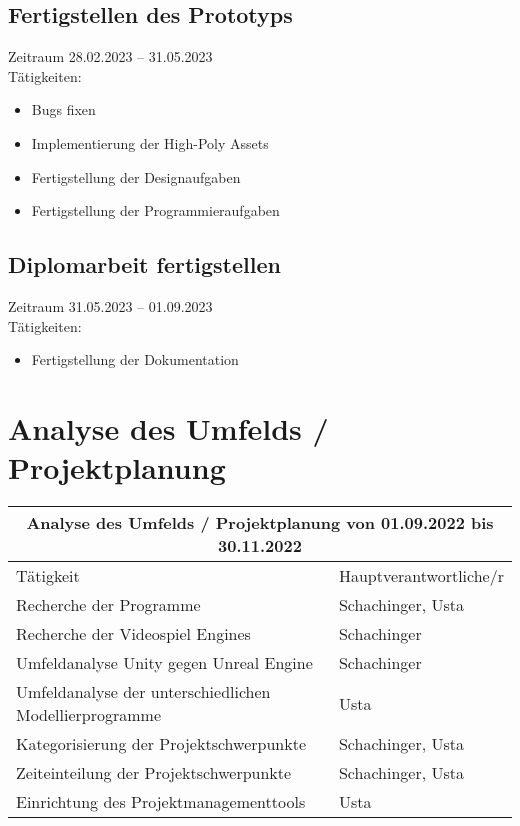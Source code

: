 \subsection{Fertigstellen des Prototyps}
Zeitraum 28.02.2023 – 31.05.2023\\
Tätigkeiten:
\begin{itemize}
    \item Bugs fixen
    \item Implementierung der High-Poly Assets
    \item Fertigstellung der Designaufgaben
    \item Fertigstellung der Programmieraufgaben
\end{itemize}

\subsection{Diplomarbeit fertigstellen}
Zeitraum 31.05.2023 – 01.09.2023\\
Tätigkeiten:
\begin{itemize}
    \item Fertigstellung der Dokumentation
\end{itemize}


\pagebreak

\section{Analyse des Umfelds / Projektplanung}
\begin{tabular}{|m{}|m{}|}
\hline
\multicolumn{2}{|c|}{\textbf{Analyse des Umfelds / Projektplanung von 01.09.2022 bis 30.11.2022}} \\
\hline
Tätigkeit & Hauptverantwortliche/r \\
\hline
Recherche der Programme & Schachinger, Usta \\
\hline
Recherche der Videospiel Engines & Schachinger \\
\hline
Umfeldanalyse Unity gegen Unreal Engine & Schachinger \\
\hline
Umfeldanalyse der unterschiedlichen Modellierprogramme & Usta \\
\hline
Kategorisierung der Projektschwerpunkte & Schachinger, Usta \\
\hline
Zeiteinteilung der Projektschwerpunkte & Schachinger, Usta \\
\hline
Einrichtung des Projektmanagementtools & Usta \\
\hline
\end{tabular}

